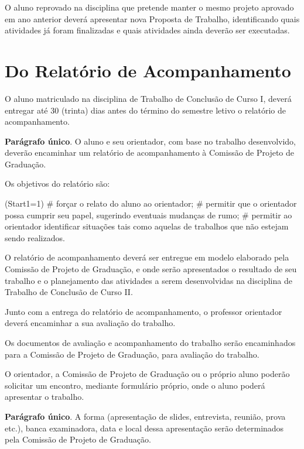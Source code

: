 \documentclass[12pt,geral,titlewithdate]{uftdocs}
\begin{document}
\artigo O aluno reprovado na disciplina que pretende manter o mesmo projeto aprovado em ano anterior deverá apresentar nova Proposta de Trabalho, identificando quais atividades já foram finalizadas e quais atividades ainda deverão ser executadas. 

\chapter{Do Relatório de Acompanhamento}

\artigo O aluno matriculado na disciplina de Trabalho de Conclusão de Curso I, deverá entregar até 30 (trinta) dias antes do término do semestre letivo o relatório de acompanhamento.

{\bf Parágrafo único}. O aluno e seu orientador, com base no trabalho desenvolvido, deverão encaminhar um relatório de acompanhamento à Comissão de Projeto de Graduação.

\artigo Os objetivos do relatório são:

\begin{easylist}\ListProperties(Start1=1)
# forçar o relato do aluno ao orientador;
# permitir que o orientador possa cumprir seu papel, sugerindo eventuais mudanças de rumo;
# permitir ao orientador identificar situações tais como aquelas de trabalhos que não estejam sendo realizados.
\end{easylist}

\artigo O relatório de acompanhamento deverá ser entregue em modelo elaborado pela Comissão de Projeto de Graduação, e onde serão apresentados o resultado de seu trabalho e o planejamento das atividades a serem desenvolvidas na disciplina de Trabalho de Conclusão de Curso II.

\artigo Junto com a entrega do relatório de acompanhamento, o professor orientador deverá encaminhar a sua avaliação do trabalho.

\artigo Os documentos de avaliação e acompanhamento do trabalho serão encaminhados para a Comissão de Projeto de Graduação, para avaliação do trabalho.

\artigo O orientador, a Comissão de Projeto de Graduação ou o próprio aluno poderão solicitar um encontro, mediante formulário próprio, onde o aluno poderá apresentar o trabalho. 

{\bf Parágrafo único}. A forma (apresentação de slides, entrevista, reunião, prova etc.), banca examinadora, data e local dessa apresentação serão determinados pela Comissão de Projeto de Graduação.
\end{document}
